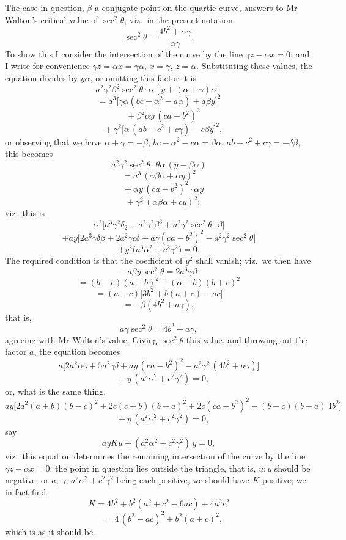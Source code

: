 \documentclass[11pt]{article}
\begin{document}
\medskip

The case in question, $\beta$ a conjugate point on the quartic curve, answers to Mr Walton's critical value of $\sec^{2}\theta$, viz.\ in the present notation
\[
\sec^{2}\theta = \frac{4b^{2} + \alpha\gamma}{\alpha\gamma}.
\]
To show this I consider the intersection of the curve by the line $\gamma z - \alpha x = 0$; and I write for convenience $\gamma z = \alpha x = \gamma\alpha$, $x = \gamma$, $z = \alpha$. Substituting these values, the equation divides by $y\alpha$, or omitting this factor it is
\[
a^{2}\gamma^{2}\beta^{2}\sec^{2}\theta\!\cdot\! \alpha\,[y + (\alpha+\gamma)\alpha]
\]
\[
= a^{3}\bigl[\gamma\alpha(bc - \alpha^{2} - a\alpha) + a\beta y\bigr]^{2}
\]
\[
\quad + \beta^{2}\alpha y\,(ca - b^{2})^{2}
\]
\[
\quad + \gamma^{2}\bigl[\alpha\,(ab - c^{2} + c\gamma) - c\beta y\bigr]^{2},
\]
or observing that we have $\alpha + \gamma = -\beta$, $bc - \alpha^{2} - c\alpha = \beta\alpha$, $ab - c^{2} + c\gamma = -\delta\beta$, this becomes
\[
a^{2}\gamma^{2}\sec^{2}\theta\cdot \theta\alpha\,(y - \beta\alpha)
\]
\[
= a^{3}\,(\gamma\beta\alpha + \alpha y)^{2}
\]
\[
\quad + \alpha y\,(ca - b^{2})^{2}\!\cdot\!\alpha y
\]
\[
\quad + \gamma^{2}\,(\alpha\beta\alpha + c y)^{2};
\]
viz.\ this is
\[
\alpha^{2}\bigl[a^{3}\gamma^{2}\delta_{2} + a^{2}\gamma^{2}\beta^{3} + a^{2}\gamma^{2}\sec^{2}\theta\cdot\beta\bigr]
\]
\[
+ ay\bigl[2a^{3}\gamma\delta\beta + 2a^{2}\gamma c\delta + a\gamma(ca - b^{2})^{2} - a^{2}\gamma^{2}\sec^{2}\theta\bigr]
\]
\[
+ y^{2}\bigl(a^{3}\alpha^{2} + c^{2}\gamma^{2}\bigr) = 0.
\]
The required condition is that the coefficient of $y^{2}$ shall vanish; viz.\ we then have
\[
-a\beta y\sec^{2}\theta = 2a^{3}\gamma\beta
\]
\[
= (b-c)(a+b)^{2} + (\alpha-b)(b+c)^{2}
\]
\[
= (a-c)\bigl[3b^{2} + b(a+c) - ac\bigr]
\]
\[
= -\beta(4b^{2} + a\gamma),
\]
that is,
\[
a\gamma\sec^{2}\theta = 4b^{2} + a\gamma,
\]
agreeing with Mr Walton's value. Giving $\sec^{2}\theta$ this value, and throwing out the factor $a$, the equation becomes
\[
a\bigl[2a^{2}\alpha\gamma + 5a^{2}\gamma\delta + ay\,(ca - b^{2})^{2} - a^{2}\gamma^{2}\,(4b^{2} + a\gamma)\bigr]
\]
\[
\quad + y\,(a^{2}\alpha^{2} + c^{2}\gamma^{2}) = 0;
\]
or, what is the same thing,
\[
a y\bigl[2a^{2}(a + b)(b-c)^{2} + 2c(c + b)(b-a)^{2} + 2c(ca-b^{2})^{2} - (b-c)(b-a)\,4b^{2}\bigr]
\]
\[
\quad + y\,(a^{2}\alpha^{2} + c^{2}\gamma^{2}) = 0,
\]
say
\[
ayKu + (a^{2}\alpha^{2} + c^{2}\gamma^{2})\,y = 0,
\]
viz.\ this equation determines the remaining intersection of the curve by the line $\gamma z - \alpha x = 0$; the point in question lies outside the triangle, that is, $u : y$ should be negative; or $a$, $\gamma$, $a^{2}\alpha^{2} + c^{2}\gamma^{2}$ being each positive, we should have $K$ positive; we in fact find
\[
K = 4b^{2} + b^{2}(a^{2} + c^{2} - 6ac) + 4a^{2}c^{2}
\]
\[
\quad = 4\,(b^{2} - ac)^{2} + b^{2}(a + c)^{2},
\]
which is as it should be.
\end{document}
